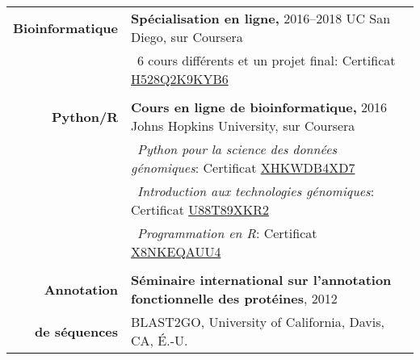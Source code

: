 \documentclass[letterpaper,10pt]{article}
\begin{document}
\begin{tabular}{r|p{13.5cm}}

\textbf{Bioinformatique}
& \textbf{Spécialisation en ligne,} 2016--2018
  \hspace{1mm} \small{UC San Diego, sur Coursera} \\
& \textbullet{}~6 cours différents et un projet final: \hspace{0.5mm}
  Certificat
  \href{https://www.coursera.org/account/accomplishments/specialization/H528Q2K9KYB6}
  {H528Q2K9KYB6} \\

\multicolumn{2}{c}{} \\

\textbf{Python/R}
& \textbf{Cours en ligne de bioinformatique,} 2016
  \hspace{1mm} \small{Johns Hopkins University, sur Coursera} \\
& \textbullet{}~\emph{Python pour la science des données génomiques}: \hspace{0.5mm}
  Certificat
  \href{https://www.coursera.org/account/accomplishments/verify/XHKWDB4XD7}
  {XHKWDB4XD7} \\
& \textbullet{}~\emph{Introduction aux technologies génomiques}: \hspace{0.5mm}
  Certificat
  \href{https://www.coursera.org/account/accomplishments/verify/U88T89XKR2}
  {U88T89XKR2} \\
& \textbullet{}~\emph{Programmation en R}: \hspace{0.5mm}
  Certificat
  \href{https://www.coursera.org/account/accomplishments/verify/X8NKEQAUU4}
  {X8NKEQAUU4} \\

\multicolumn{2}{c}{} \\

\textbf{Annotation}
& \textbf{Séminaire international sur l’annotation fonctionnelle des protéines}, 2012 \\
\textbf{de séquences}
& BLAST2GO, University of California, Davis, CA, É.-U. \\

\end{tabular}

\bigskip
\bigskip

\end{document}
